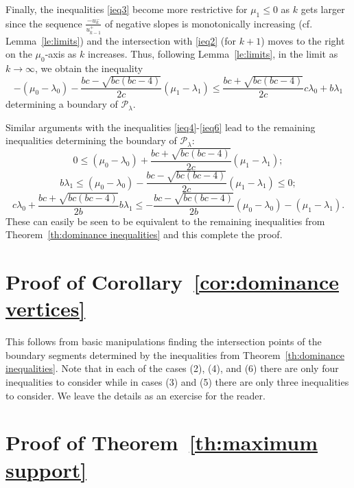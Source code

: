 \documentclass{amsart}
\numberwithin{theorem}{section}
\newcommand{\cP}{\mathcal{P}}
\begin{document}
  Finally, the inequalities \eqref{ieq3} become more restrictive for $\mu_1\le0$ as $k$ gets larger since the sequence $\frac{-u_k^-}{u_{k-1}^+}$ of negative slopes is monotonically increasing (cf. Lemma~\ref{le:limits}) and the intersection with \eqref{ieq2} (for $k+1$) moves to the right on the $\mu_0$-axis as $k$ increases.
  Thus, following Lemma~\ref{le:limits}, in the limit as $k\to\infty$, we obtain the inequality
  \[ -(\mu_0-\lambda_0)-\frac{bc-\sqrt{bc(bc-4)}}{2c}(\mu_1-\lambda_1) \le \frac{bc+\sqrt{bc(bc-4)}}{2c}c\lambda_0+b\lambda_1 \]
  determining a boundary of $\cP_\lambda$.

  Similar arguments with the inequalities \eqref{ieq4}-\eqref{ieq6} lead to the remaining inequalities determining the boundary of $\cP_\lambda$:
  \[ 0 \le (\mu_0-\lambda_0)+\frac{bc+\sqrt{bc(bc-4)}}{2c}(\mu_1-\lambda_1);\]
  \[ b\lambda_1 \le (\mu_0-\lambda_0)-\frac{bc-\sqrt{bc(bc-4)}}{2c}(\mu_1-\lambda_1) \le 0;\]
  \[ c\lambda_0+\frac{bc+\sqrt{bc(bc-4)}}{2b}b\lambda_1 \le -\frac{bc-\sqrt{bc(bc-4)}}{2b}(\mu_0-\lambda_0)-(\mu_1-\lambda_1).\]
  These can easily be seen to be equivalent to the remaining inequalities from Theorem~\ref{th:dominance inequalities} and this complete the proof.


\section{Proof of Corollary~\ref{cor:dominance vertices}}
\label{sec:dominance vertices}

  This follows from basic manipulations finding the intersection points of the boundary segments determined by the inequalities from Theorem~\ref{th:dominance inequalities}.
  Note that in each of the cases (2), (4), and (6) there are only four inequalities to consider while in cases (3) and (5) there are only three inequalities to consider.
  We leave the details as an exercise for the reader.


\section{Proof of Theorem~\ref{th:maximum support}}
\label{sec:maximum support} 
\end{document}
